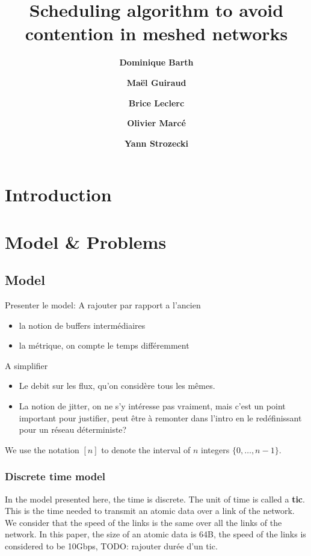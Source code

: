 \documentclass[french]{article}
\begin{document}
\title{Scheduling algorithm to avoid contention in meshed networks}
 

\newcommand{\todo}[1]{{\color{red} TODO: {#1}}}
\newcommand\spall{\textsc{SPALL}\xspace}
\newtheorem{theorem}{Theorem}
\newtheorem{lemma}[theorem]{Lemma}
\author[1]{\bf{ {Dominique Barth}}}
\author[1,2]{\bf{ {Ma\"el Guiraud}}}
\author[2]{\bf{ {Brice Leclerc}}}
\author[2]{\bf{ {Olivier Marc\'e}}}
\author[1]{\bf{ {Yann Strozecki}}}




\maketitle

\section*{Introduction}
\section{Model \& Problems}
\subsection{Model}
Presenter le model: 
A rajouter par rapport a l'ancien\begin{itemize}
\item la notion de buffers intermédiaires
\item la métrique, on compte le temps différemment 
\end{itemize}
A simplifier \begin{itemize}
\item Le debit sur les flux, qu'on considère tous les mêmes.
\item La notion de jitter, on ne s'y intéresse pas vraiment, mais c'est un point important pour justifier, peut être à remonter dans l'intro en le redéfinissant pour un réseau déterministe?
\end{itemize} 

We use the notation $[n]$ to denote the interval of $n$ integers $\{0,\dots,n-1\}$.

  \subsubsection{Discrete time model}
  In the model presented here, the time is discrete. The unit of time  is called a {\bf tic}. This is the time needed to transmit an atomic data over a link of the network. We consider that the speed of the links is the same over all the links of the network. 
In this paper, the size of an atomic data is 64B, the speed of the links is considered to be 10Gbps, \todo{rajouter durée d'un tic}.
\end{document}
